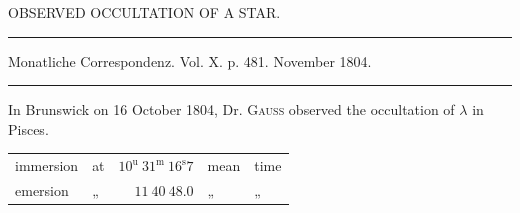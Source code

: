 \begin{center}
OBSERVED OCCULTATION OF A STAR.
\end{center}

\begin{center}
\rule{0.6\linewidth}{0.4pt}

Monatliche Correspondenz. Vol. X. p. 481. November 1804.

\rule{0.6\linewidth}{0.4pt}
\end{center}

In Brunswick on 16 October 1804, Dr. \textsc{Gauss} observed the occultation of $\lambda$ in Pisces.

\begin{center}
\begingroup\fontsize{10}{12}\selectfont\setlength{\tabcolsep}{3pt}\renewcommand{\arraystretch}{1.1}
\begin{tabular}{llrll}
immersion & at & $10^{\mathrm u}\ 31^{\mathrm m}\ 16^{\mathrm s}7$ & mean & time \\
emersion & „ & $11\ 40\ 48.0$ & „ & „ \\
\end{tabular}\endgroup
\end{center}
